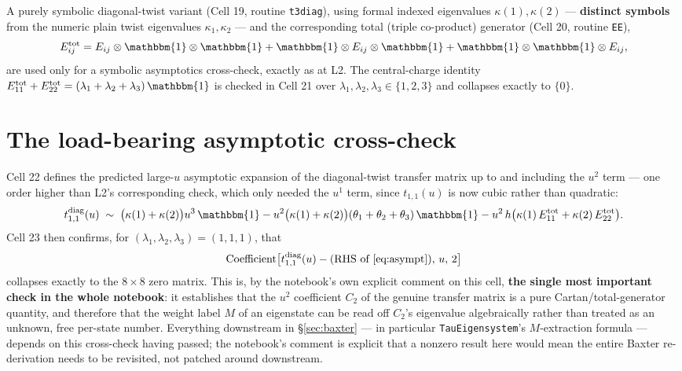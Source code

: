 \documentclass[11pt]{article}
\begin{document}
A purely symbolic diagonal-twist variant (Cell 19, routine \texttt{t3diag}), using formal indexed
eigenvalues $\kappa(1),\kappa(2)$ --- \textbf{distinct symbols} from the numeric plain twist
eigenvalues $\kappa_1,\kappa_2$ --- and the corresponding total (triple co-product) generator
(Cell 20, routine \texttt{EE}),
\[
  E_{ij}^{\mathrm{tot}} = E_{ij}\otimes\mathbbm{1}\otimes\mathbbm{1}
  + \mathbbm{1}\otimes E_{ij}\otimes\mathbbm{1}
  + \mathbbm{1}\otimes\mathbbm{1}\otimes E_{ij},
\]
are used only for a symbolic asymptotics cross-check, exactly as at L2. The central-charge identity
$E_{11}^{\mathrm{tot}}+E_{22}^{\mathrm{tot}}=(\lambda_1+\lambda_2+\lambda_3)\,\mathbbm{1}$ is checked
in Cell 21 over $\lambda_1,\lambda_2,\lambda_3\in\{1,2,3\}$ and collapses exactly to $\{0\}$.

\section{The load-bearing asymptotic cross-check}
\label{sec:asymptotics}

Cell 22 defines the predicted large-$u$ asymptotic expansion of the diagonal-twist transfer matrix up
to and including the $u^2$ term --- one order higher than L2's corresponding check, which only needed
the $u^1$ term, since $t_{1,1}(u)$ is now cubic rather than quadratic:
\begin{equation}
  t^{\mathrm{diag}}_{1,1}(u) \;\sim\; \bigl(\kappa(1)+\kappa(2)\bigr)u^3\,\mathbbm{1}
  - u^2\bigl(\kappa(1)+\kappa(2)\bigr)(\theta_1+\theta_2+\theta_3)\,\mathbbm{1}
  - u^2\,h\bigl(\kappa(1)\,E_{11}^{\mathrm{tot}} + \kappa(2)\,E_{22}^{\mathrm{tot}}\bigr).
  \label{eq:asympt}
\end{equation}
Cell 23 then confirms, for $(\lambda_1,\lambda_2,\lambda_3)=(1,1,1)$, that
\[
  \operatorname{Coefficient}\bigl[t^{\mathrm{diag}}_{1,1}(u) - \text{(RHS of \eqref{eq:asympt})},\, u,\, 2\bigr]
\]
collapses exactly to the $8\times8$ zero matrix. This is, by the notebook's own explicit comment on
this cell, \textbf{the single most important check in the whole notebook}: it establishes that the
$u^2$ coefficient $C_2$ of the genuine transfer matrix is a pure Cartan/total-generator quantity, and
therefore that the weight label $M$ of an eigenstate can be read off $C_2$'s eigenvalue algebraically
rather than treated as an unknown, free per-state number. Everything downstream in
\S\ref{sec:baxter} --- in particular \texttt{TauEigensystem}'s $M$-extraction formula --- depends on
this cross-check having passed; the notebook's comment is explicit that a nonzero result here would
mean the entire Baxter re-derivation needs to be revisited, not patched around downstream.
\end{document}
